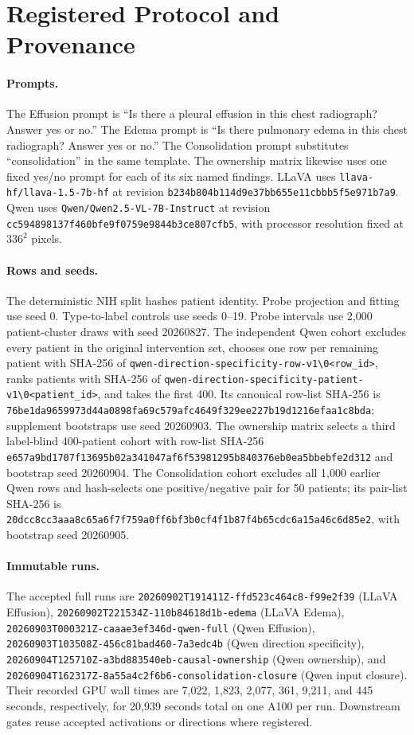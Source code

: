 \section{Registered Protocol and Provenance}
\label{app:protocol}

\paragraph{Prompts.}
The Effusion prompt is ``Is there a pleural effusion in this chest radiograph? Answer yes or no.'' The Edema prompt is ``Is there pulmonary edema in this chest radiograph? Answer yes or no.'' The Consolidation prompt substitutes ``consolidation'' in the same template. The ownership matrix likewise uses one fixed yes/no prompt for each of its six named findings. LLaVA uses \texttt{llava-hf/llava-1.5-7b-hf} at revision \texttt{b234b804b114d9e37bb655e11cbbb5f5e971b7a9}. Qwen uses \texttt{Qwen/Qwen2.5-VL-7B-Instruct} at revision \texttt{cc594898137f460bfe9f0759e9844b3ce807cfb5}, with processor resolution fixed at $336^2$ pixels.

\paragraph{Rows and seeds.}
The deterministic NIH split hashes patient identity. Probe projection and fitting use seed 0. Type-to-label controls use seeds 0--19. Probe intervals use 2,000 patient-cluster draws with seed 20260827. The independent Qwen cohort excludes every patient in the original intervention set, chooses one row per remaining patient with SHA-256 of \texttt{qwen-direction-specificity-row-v1\textbackslash0<row\_id>}, ranks patients with SHA-256 of \texttt{qwen-direction-specificity-patient-v1\textbackslash0<patient\_id>}, and takes the first 400. Its canonical row-list SHA-256 is \texttt{76be1da9659973d44a0898fa69c579afc4649f329ee227b19d1216efaa1c8bda}; supplement bootstraps use seed 20260903. The ownership matrix selects a third label-blind 400-patient cohort with row-list SHA-256 \texttt{e657a9bd1707f13695b02a341047af6f53981295b840376eb0ea5bbebfe2d312} and bootstrap seed 20260904. The Consolidation cohort excludes all 1,000 earlier Qwen rows and hash-selects one positive/negative pair for 50 patients; its pair-list SHA-256 is \texttt{20dcc8cc3aaa8c65a6f7f759a0ff6bf3b0cf4f1b87f4b65cdc6a15a46c6d85e2}, with bootstrap seed 20260905.

\paragraph{Immutable runs.}
The accepted full runs are \texttt{20260902T191411Z-ffd523c464c8-f99e2f39} (LLaVA Effusion), \texttt{20260902T221534Z-110b84618d1b-edema} (LLaVA Edema), \texttt{20260903T000321Z-caaae3ef346d-qwen-full} (Qwen Effusion), \texttt{20260903T103508Z-456c81bad460-7a3edc4b} (Qwen direction specificity), \texttt{20260904T125710Z-a3bd883540eb-causal-ownership} (Qwen ownership), and \texttt{20260904T162317Z-8a55a4c2f6b6-consolidation-closure} (Qwen input closure). Their recorded GPU wall times are 7,022, 1,823, 2,077, 361, 9,211, and 445 seconds, respectively, for 20,939 seconds total on one A100 per run. Downstream gates reuse accepted activations or directions where registered.

